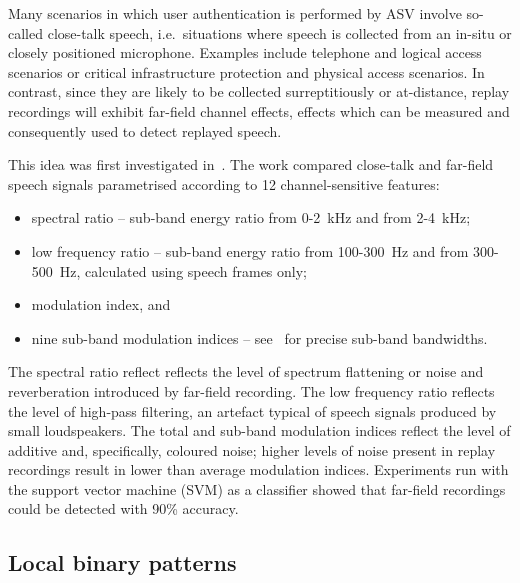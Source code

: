 Many scenarios in which user authentication is performed by ASV involve so-called close-talk speech, i.e.\ situations where speech is collected from an in-situ or closely positioned microphone.  Examples include telephone and logical access scenarios or critical infrastructure protection and physical access scenarios.  In contrast, since they are likely to be collected surreptitiously or at-distance, replay recordings will exhibit far-field channel effects, effects which can be measured and consequently used to detect replayed speech.  

This idea was first investigated in~\cite{Villalba2011}.  The work compared close-talk and far-field speech signals parametrised according to 12 channel-sensitive features:


\begin{itemize}
\item spectral ratio -- sub-band energy ratio from 0-2~kHz and from 2-4~kHz; 
\item low frequency ratio -- sub-band energy ratio from 100-300~Hz and from 300-500~Hz, calculated using speech frames only;
\item modulation index, and
\item nine sub-band modulation indices -- see~\cite{Villalba2011} for precise sub-band bandwidths.
\end{itemize}


The spectral ratio reflect reflects the level of spectrum flattening or noise and reverberation introduced by far-field recording.  The low frequency ratio reflects the level of high-pass filtering, an artefact typical of speech signals  produced by small loudspeakers.  The total and sub-band modulation indices reflect the level of additive and, specifically, coloured noise; higher levels of noise present in replay recordings result in lower than average modulation indices.  Experiments run with the support vector machine (SVM) as a classifier showed that far-field recordings could be detected with 90\% accuracy.  %



\subsection{Local binary patterns}


